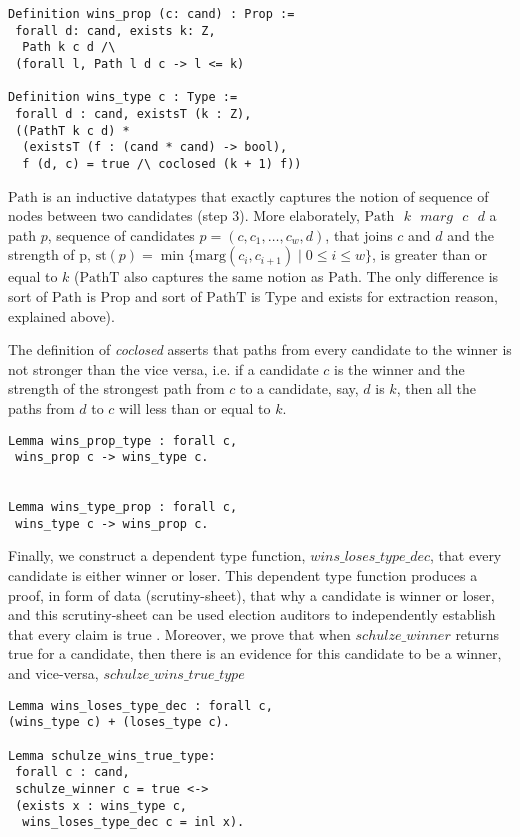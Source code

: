 \documentclass[compsoc,conference,a4paper,10pt,times]{IEEEtran}
\begin{document}
	  
\begin{verbatim}
Definition wins_prop (c: cand) : Prop := 
 forall d: cand, exists k: Z,
  Path k c d /\ 
 (forall l, Path l d c -> l <= k)
	 
Definition wins_type c : Type :=
 forall d : cand, existsT (k : Z),
 ((PathT k c d) *
  (existsT (f : (cand * cand) -> bool), 
  f (d, c) = true /\ coclosed (k + 1) f))
\end{verbatim}

\noindent
$\mathrm{Path}$ is an inductive datatypes that exactly captures the notion of 
sequence of nodes between two candidates (step 3). 
More elaborately, 
$\mathrm{Path} \text{ }k \text{ }marg \text{ }c \text{ }d$ a path $p$, sequence of candidates 
$p= (c,c_{1}, \dots ,c_{w},d)$, that joins $c$ and $d$ and the strength of 
p, $\mathrm{st}(p) =  \min \lbrace \mathrm{marg} (c_i, c_{i+1}) \mid 0 
\leq i \leq w \rbrace$, is greater than or equal to $k$ ($\mathrm{PathT}$ also captures 
the same notion as $\mathrm{Path}$. The only difference is sort of $\mathrm{Path}$ is Prop 
and sort of $\mathrm{PathT}$ is Type and exists for extraction reason, explained above).

\noindent
The definition of \textit{coclosed} asserts that
paths from every candidate to the winner 
is not stronger than the vice versa, i.e.
if a candidate $c$ is the winner and the strength 
of the strongest path from $c$ to a candidate,  say, $d$ is $k$, 
then all the paths from $d$ to $c$ will less than or equal to $k$.

\begin{verbatim}
Lemma wins_prop_type : forall c, 
 wins_prop c -> wins_type c.
   

Lemma wins_type_prop : forall c, 
 wins_type c -> wins_prop c.  
\end{verbatim}

\noindent
Finally, we construct a dependent type function, $wins\_loses\_type\_dec$, 
that every candidate is either winner or loser. This dependent type 
function produces a proof, in form of 
data (scrutiny-sheet), that why a candidate is winner or loser, and this 
scrutiny-sheet can be used election auditors to independently establish 
that every claim is true \cite{Arkoudas:2005:DRC}. Moreover,
we prove that when $schulze\_winner$ returns true for a candidate, then
there is an evidence for this candidate to be a winner, and vice-versa, 
$schulze\_wins\_true\_type$

\begin{verbatim}
Lemma wins_loses_type_dec : forall c, 
(wins_type c) + (loses_type c).

Lemma schulze_wins_true_type: 
 forall c : cand, 
 schulze_winner c = true <-> 
 (exists x : wins_type c, 
  wins_loses_type_dec c = inl x).


\end{verbatim}
\end{document}
